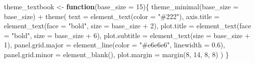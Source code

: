 \documentclass[
  letterpaper,
  DIV=11,
  numbers=noendperiod]{scrreprt}
\newenvironment{Shaded}{\begin{snugshade}}{\end{snugshade}}
\newcommand{\AttributeTok}[1]{\textcolor[rgb]{0.40,0.45,0.13}{#1}}
\newcommand{\ControlFlowTok}[1]{\textcolor[rgb]{0.00,0.23,0.31}{\textbf{#1}}}
\newcommand{\DecValTok}[1]{\textcolor[rgb]{0.68,0.00,0.00}{#1}}
\newcommand{\FloatTok}[1]{\textcolor[rgb]{0.68,0.00,0.00}{#1}}
\newcommand{\FunctionTok}[1]{\textcolor[rgb]{0.28,0.35,0.67}{#1}}
\newcommand{\NormalTok}[1]{\textcolor[rgb]{0.00,0.23,0.31}{#1}}
\newcommand{\OtherTok}[1]{\textcolor[rgb]{0.00,0.23,0.31}{#1}}
\newcommand{\SpecialCharTok}[1]{\textcolor[rgb]{0.37,0.37,0.37}{#1}}
\newcommand{\StringTok}[1]{\textcolor[rgb]{0.13,0.47,0.30}{#1}}
\begin{document}
\begin{Shaded}
\begin{Highlighting}[]
\NormalTok{theme\_textbook }\OtherTok{\textless{}{-}} \ControlFlowTok{function}\NormalTok{(}\AttributeTok{base\_size =} \DecValTok{15}\NormalTok{)\{}
  \FunctionTok{theme\_minimal}\NormalTok{(}\AttributeTok{base\_size =}\NormalTok{ base\_size) }\SpecialCharTok{+}
    \FunctionTok{theme}\NormalTok{(}
      \AttributeTok{text =} \FunctionTok{element\_text}\NormalTok{(}\AttributeTok{color =} \StringTok{"\#222"}\NormalTok{),}
      \AttributeTok{axis.title =} \FunctionTok{element\_text}\NormalTok{(}\AttributeTok{face =} \StringTok{"bold"}\NormalTok{, }\AttributeTok{size =}\NormalTok{ base\_size }\SpecialCharTok{+} \DecValTok{2}\NormalTok{),}
      \AttributeTok{plot.title =} \FunctionTok{element\_text}\NormalTok{(}\AttributeTok{face =} \StringTok{"bold"}\NormalTok{, }\AttributeTok{size =}\NormalTok{ base\_size }\SpecialCharTok{+} \DecValTok{6}\NormalTok{),}
      \AttributeTok{plot.subtitle =} \FunctionTok{element\_text}\NormalTok{(}\AttributeTok{size =}\NormalTok{ base\_size }\SpecialCharTok{+} \DecValTok{1}\NormalTok{),}
      \AttributeTok{panel.grid.major =} \FunctionTok{element\_line}\NormalTok{(}\AttributeTok{color =} \StringTok{"\#e6e6e6"}\NormalTok{, }\AttributeTok{linewidth =} \FloatTok{0.6}\NormalTok{),}
      \AttributeTok{panel.grid.minor =} \FunctionTok{element\_blank}\NormalTok{(),}
      \AttributeTok{plot.margin =} \FunctionTok{margin}\NormalTok{(}\DecValTok{8}\NormalTok{, }\DecValTok{14}\NormalTok{, }\DecValTok{8}\NormalTok{, }\DecValTok{8}\NormalTok{)}
\NormalTok{    )}
\NormalTok{\}}


\end{Highlighting}
\end{Shaded}
\end{document}
